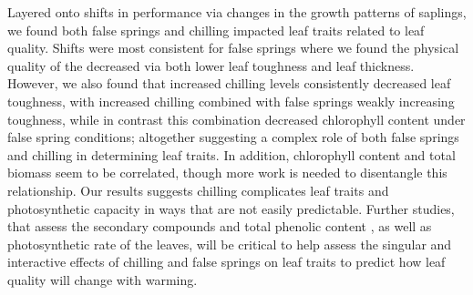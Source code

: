 \documentclass{article}\usepackage[]{graphicx}\usepackage[]{color}
\begin{document}
Layered onto shifts in performance via changes in the growth patterns of saplings, we found both false springs and chilling impacted leaf traits related to leaf quality. Shifts were most consistent for false springs where we found the physical quality of the decreased via both lower leaf toughness and leaf thickness. However, we also found that increased chilling levels consistently decreased leaf toughness, with increased chilling combined with false springs weakly increasing toughness, while in contrast this combination decreased chlorophyll content under false spring conditions; altogether suggesting a complex role of both false springs and chilling in determining leaf traits. In addition, chlorophyll content and total biomass seem to be correlated, though more work is needed to disentangle this relationship. Our results suggests chilling complicates leaf traits and photosynthetic capacity \citep{Bauerle2012,Huang2020,Stinziano2017,Zani2020} in ways that are not easily predictable. Further studies, that assess the secondary compounds and total phenolic content \citep{Ayres1993, Webber2016}, as well as photosynthetic rate of the leaves, will be critical to help assess the singular and interactive effects of chilling and false springs on leaf traits to predict how leaf quality will change with warming. 

\end{document}
